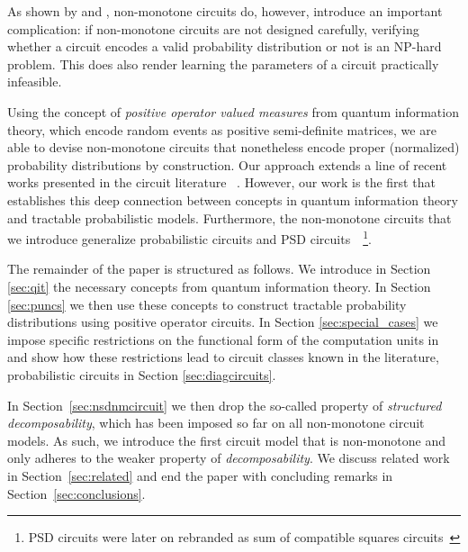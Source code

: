 As shown by \citet{harviainen2023inference} and \citet{agarwalprobabilistic}, non-monotone circuits do, however, introduce an important complication: if non-monotone circuits are not designed carefully, verifying whether a circuit encodes a valid probability distribution or not is an NP-hard problem. This does also render learning the parameters of a circuit practically infeasible.

Using the concept of \textit{positive operator valued measures} from quantum information theory, which encode random events as positive semi-definite matrices, we are able to devise non-monotone circuits that nonetheless encode proper (normalized) probability distributions by construction.
Our approach extends a line of recent works presented in the circuit literature ~\citep{sladek2023encoding,loconte2024subtractive,wangrelationship,loconte2025sum}. However, our work is the first that establishes this deep connection between concepts in quantum information theory and tractable probabilistic models.
Furthermore, the non-monotone circuits that we introduce generalize probabilistic circuits and PSD circuits~~\citep{sladek2023encoding,loconte2024subtractive,loconte2025sum}\footnote{PSD circuits were later on rebranded as sum of compatible squares circuits~\citep{loconte2025sum}}.

The remainder of the paper is structured as follows. We introduce in Section \ref{sec:qit} the necessary concepts from quantum information theory. In Section \ref{sec:puncs} we then use these concepts to construct tractable probability distributions using positive operator circuits. In Section \ref{sec:special_cases} we impose specific restrictions on the functional form of the computation units in \puncs and show how these restrictions lead to circuit classes known in the literature, \eg probabilistic circuits in Section \ref{sec:diagcircuits}.

In Section~\ref{sec:nsdnmcircuit} we then drop the so-called property of \textit{structured decomposability}, which has been imposed so far on all non-monotone circuit models. As such, we introduce the first circuit model that is non-monotone and only adheres to the weaker property of \textit{decomposability}. We discuss related work in Section~\ref{sec:related} and end the paper with concluding remarks in Section~\ref{sec:conclusions}.












